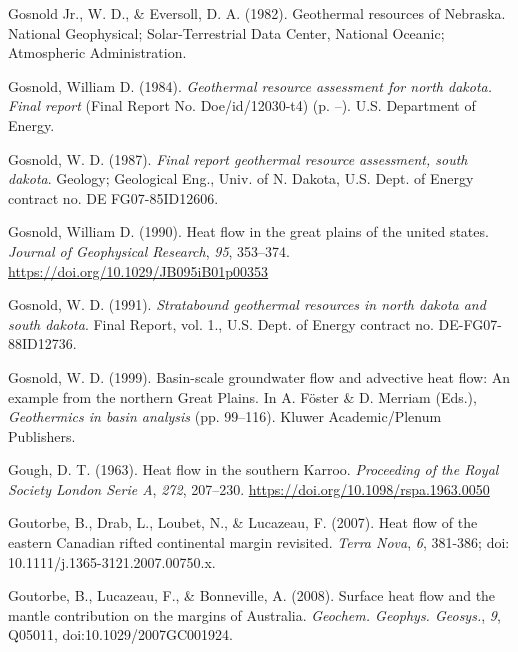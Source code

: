 \documentclass[draft,linenumbers]{agujournal2018}
\begin{document}
\leavevmode{}%
Gosnold Jr., W. D., \& Eversoll, D. A. (1982). Geothermal resources of
{Nebraska}. National Geophysical; Solar-Terrestrial Data Center,
National Oceanic; Atmospheric Administration.

\leavevmode{}%
Gosnold, William D. (1984). \emph{Geothermal resource assessment for
north dakota. Final report} (Final Report No. Doe/id/12030-t4) (p. --).
U.S. Department of Energy.

\leavevmode{}%
Gosnold, W. D. (1987). \emph{Final report geothermal resource
assessment, south dakota}. Geology; Geological Eng., Univ. of N. Dakota,
U.S. Dept. of Energy contract no. DE FG07-85ID12606.

\leavevmode{}%
Gosnold, William D. (1990). Heat flow in the great plains of the united
states. \emph{Journal of Geophysical Research}, \emph{95}, 353--374.
\url{https://doi.org/10.1029/JB095iB01p00353}

\leavevmode{}%
Gosnold, W. D. (1991). \emph{Stratabound geothermal resources in north
dakota and south dakota}. Final Report, vol. 1., U.S. Dept. of Energy
contract no. DE-FG07-88ID12736.

\leavevmode{}%
Gosnold, W. D. (1999). Basin-scale groundwater flow and advective heat
flow: An example from the northern {Great Plains}. In A. Föster \& D.
Merriam (Eds.), \emph{Geothermics in basin analysis} (pp. 99--116).
Kluwer Academic/Plenum Publishers.

\leavevmode{}%
Gough, D. T. (1963). Heat flow in the southern {Karroo}.
\emph{Proceeding of the Royal Society London Serie A}, \emph{272},
207--230. \url{https://doi.org/10.1098/rspa.1963.0050}

\leavevmode{}%
Goutorbe, B., Drab, L., Loubet, N., \& Lucazeau, F. (2007). Heat flow of
the eastern {Canadian} rifted continental margin revisited. \emph{Terra
Nova}, \emph{6}, 381-386; doi: 10.1111/j.1365-3121.2007.00750.x.

\leavevmode{}%
Goutorbe, B., Lucazeau, F., \& Bonneville, A. (2008). Surface heat flow
and the mantle contribution on the margins of {Australia}.
\emph{Geochem. Geophys. Geosys.}, \emph{9}, Q05011,
doi:10.1029/2007GC001924.
\end{document}
